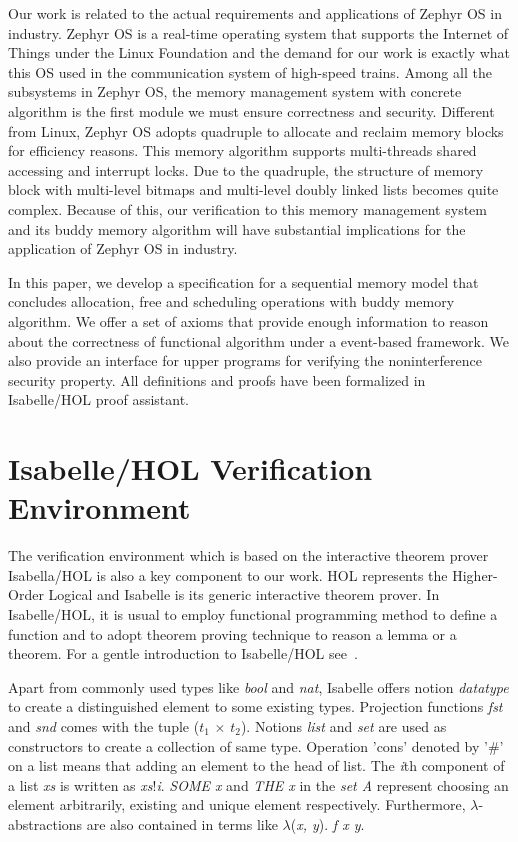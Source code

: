 \documentclass[runningheads]{llncs}
\begin{document}
Our work is related to the actual requirements and applications of Zephyr OS in industry. Zephyr OS is a real-time operating system that supports the Internet of Things under the Linux Foundation and the demand for our work is exactly what this OS used in the communication system of high-speed trains. Among all the subsystems in Zephyr OS, the memory management system with concrete algorithm is the first module we must ensure correctness and security. Different from Linux, Zephyr OS adopts quadruple to allocate and reclaim memory blocks for efficiency reasons. This memory algorithm supports multi-threads shared accessing and interrupt locks. Due to the quadruple, the structure of memory block with multi-level bitmaps and multi-level doubly linked lists becomes quite complex. Because of this, our verification to this memory management system and its buddy memory algorithm will have substantial implications for the application of Zephyr OS in industry.

In this paper, we develop a specification for a sequential memory model that concludes allocation, free and scheduling operations with buddy memory algorithm. We offer a set of axioms that provide enough information to reason about the correctness of functional algorithm under a event-based framework. We also provide an interface for upper programs for 
verifying the noninterference security property. All definitions and proofs have been formalized in Isabelle/HOL proof assistant.


\section{Isabelle/HOL Verification Environment}
The verification environment which is based on the interactive theorem prover Isabella/HOL is also a key component to our work. HOL represents the Higher-Order Logical and Isabelle is its generic interactive theorem prover. In Isabelle/HOL, it is usual to employ functional programming method to define a function and to adopt theorem proving technique to reason a lemma or a theorem. For a gentle introduction to Isabelle/HOL see~\cite{reg_Isabelle/HOL}. 

Apart from commonly used types like \textsl{bool} and \textsl{nat}, Isabelle offers notion \textsl{datatype} to create a distinguished element to some existing types. Projection functions \textsl{fst} and \textsl{snd} comes with the tuple (\textsl{$t_1$} $\times$ \textsl{$t_2$}). Notions \textsl{list} and \textsl{set} are used as constructors to create a collection of same type. Operation 'cons' denoted by '$\#$' on a list means that adding an element to the head of list. The \textsl{i}th component of a list \textsl{xs} is written as \textsl{xs}!\textsl{i}. \textsl{SOME x} and \textsl{THE x} in the \textsl{set A} represent choosing an element arbitrarily, existing and unique element respectively. Furthermore, $\lambda$-abstractions are also contained in terms like $\lambda$(\textsl{x, y}). \textsl{f x y}.
\end{document}
